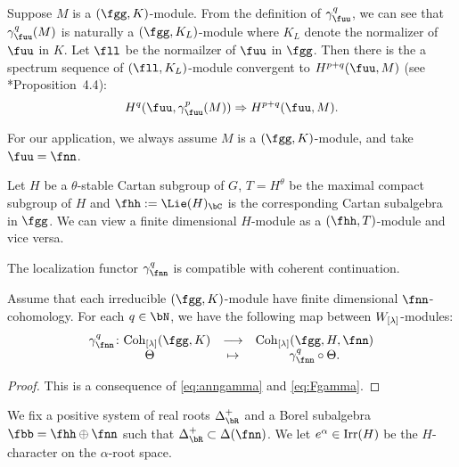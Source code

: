 \documentclass[counting_main.tex]{subfiles}
\begin{document}
Suppose $M$ is a $(\fgg,K)$-module. From the definition of $\gamma_{\fuu}^{q}$,
we can see that $\gamma_{\fuu}^{q}(M)$ is naturally a $(\fgg, K_{L})$-module
where $K_{L}$ denote the normalizer of $\fuu$ in $K$. Let $\fll$ be the
normailzer of $\fuu$ in $\fgg$. Then there is the a spectrum sequence of
$(\fll,K_{L})$-module convergent to $H^{p+q}(\fuu,M)$ (see
\cite{Cas}*{Proposition~4.4}):
\begin{equation}\label{eq:ugamma}
  H^{q}(\fuu,\gamma_{\fuu}^{p}(M)) \Rightarrow H^{p+q}(\fuu,M).
\end{equation}

For our application, we always assume $M$ is a $(\fgg,K)$-module, and take
$\fuu=\fnn$.

Let $H$ be a $\theta$-stable Cartan subgroup of $G$, $T=H^{\theta}$ be the
maximal compact subgroup of $H$ and $\fhh:=\Lie(H)_{\bC}$ is the corresponding
Cartan subalgebra in $\fgg$. We can view a finite dimensional $H$-module as a
$(\fhh,T)$-module and vice versa.

The localization functor $\gamma_{\fnn}^{q}$ is compatible with coherent
continuation.
\begin{lem}\label{lem:coh.gamma}
  Assume that each irreducible $(\fgg,K)$-module have finite dimensional
  $\fnn$-cohomology. For each $q\in \bN$, we have the following map between
  $W_{[\lambda]}$-modules:
  \[
    \begin{array}{ccc}
      \gamma_{\fnn}^{q}\colon \Coh_{[\lambda]}(\fgg,K)
      &\longrightarrow
      & \Coh_{[\lambda]}(\fgg,H,\fnn) \\
      \Theta & \mapsto & \gamma_{\fnn}^{q}\circ \Theta.
    \end{array}
  \]
\end{lem}
\begin{proof}
  This is a consequence of \eqref{eq:anngamma} and \eqref{eq:Fgamma}. \trivial[]{
    \[
      \begin{split}
        F\otimes \gamma_{\fnn}^q\Theta(\mu) & =
        \gamma_{\fnn}^{q}(F\otimes \Theta(\mu))\\
        &= \gamma_{\fnn}^{q}(\sum_{\beta\in \WT{F}} \Theta(\mu+\beta))\\
        &= \sum_{\beta\in \WT{F}}\gamma_{\fnn}^{q}( \Theta(\mu+\beta))\\
      \end{split}
    \]
  }
\end{proof}

We fix a positive system of real roots $\Delta^{+}_{\bR}$ and a Borel subalgebra
$\fbb=\fhh\oplus \fnn$ such that $\Delta^{+}_{\bR}\subset \WT{\fnn}$. We let
$e^{\alpha}\in \mathrm{Irr}(H)$ be the $H$-character on the $\alpha$-root space.
\end{document}
